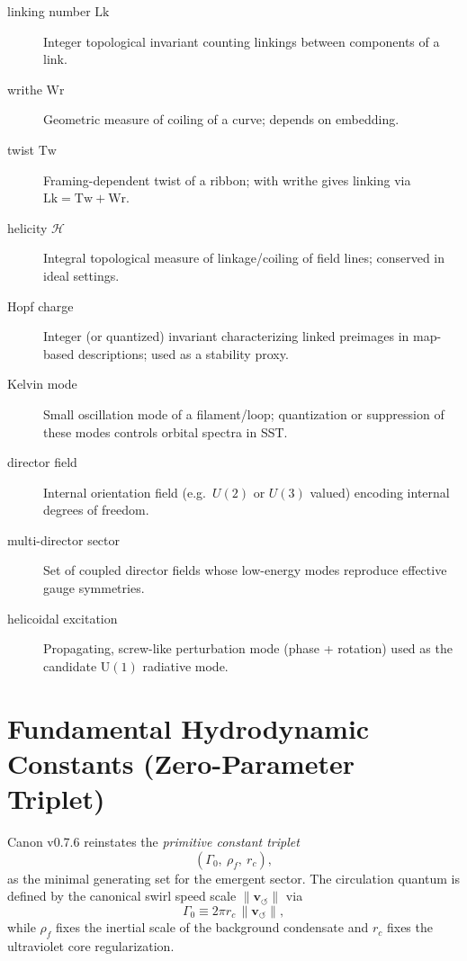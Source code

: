 \documentclass[10pt]{article}
\begin{document}
\begin{description}
\item[linking number $\mathrm{Lk}$] Integer topological invariant counting linkings between components of a link.
\item[writhe $\mathrm{Wr}$] Geometric measure of coiling of a curve; depends on embedding.
\item[twist $\mathrm{Tw}$] Framing-dependent twist of a ribbon; with writhe gives linking via $\mathrm{Lk}=\mathrm{Tw}+\mathrm{Wr}$.
\item[helicity $\mathcal{H}$] Integral topological measure of linkage/coiling of field lines; conserved in ideal settings.
\item[Hopf charge] Integer (or quantized) invariant characterizing linked preimages in map-based descriptions; used as a stability proxy.
\item[Kelvin mode] Small oscillation mode of a filament/loop; quantization or suppression of these modes controls orbital spectra in SST.
\item[director field] Internal orientation field (e.g.\ $U(2)$ or $U(3)$ valued) encoding internal degrees of freedom.
\item[multi-director sector] Set of coupled director fields whose low-energy modes reproduce effective gauge symmetries.
\item[helicoidal excitation] Propagating, screw-like perturbation mode (phase + rotation) used as the candidate $\mathrm{U}(1)$ radiative mode.
\end{description}

\clearpage

    
    \appendix

    \section{Fundamental Hydrodynamic Constants (Zero-Parameter Triplet)}
    \label{app:constants_triplet}

Canon v0.7.6 reinstates the \emph{primitive constant triplet}
\begin{equation}
    (\Gamma_0,\ \rho_{\!f},\ r_c),
\end{equation}
as the minimal generating set for the emergent sector.
The circulation quantum is defined by the canonical swirl speed scale
$\lVert \mathbf{v}_{\!\boldsymbol{\circlearrowleft}}\rVert$ via
\begin{equation}
    \Gamma_0 \equiv 2\pi r_c\,\lVert \mathbf{v}_{\!\boldsymbol{\circlearrowleft}}\rVert,
\end{equation}
while $\rho_{\!f}$ fixes the inertial scale of the background condensate and $r_c$
fixes the ultraviolet core regularization.
\end{document}
